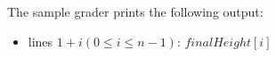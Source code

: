 The sample grader prints the following output:
\begin{itemize}
\item lines $1 + i (0 \le i \le n - 1)$: $finalHeight[i]$
\end{itemize}